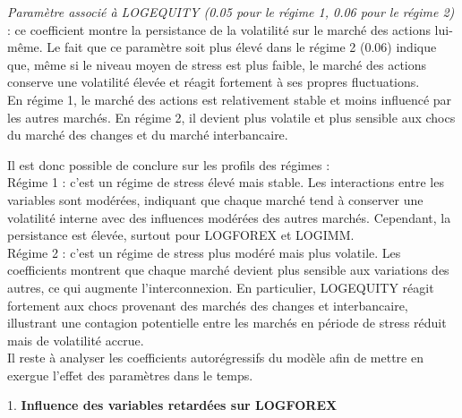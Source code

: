 \textit{Paramètre associé à LOGEQUITY (0.05 pour le régime 1, 0.06 pour le régime 2)} : ce coefficient montre la persistance de la volatilité sur le marché des actions lui-même. Le fait que ce paramètre soit plus élevé dans le régime 2 (0.06) indique que, même si le niveau moyen de stress est plus faible, le marché des actions conserve une volatilité élevée et réagit fortement à ses propres fluctuations.\\

En régime 1, le marché des actions est relativement stable et moins influencé par les autres marchés. En régime 2, il devient plus volatile et plus sensible aux chocs du marché des changes et du marché interbancaire.

\vspace{0.5cm}

Il est donc possible de conclure sur les profils des régimes :\\

Régime 1 : c’est un régime de stress élevé mais stable. Les interactions entre les variables sont modérées, indiquant que chaque marché tend à conserver une volatilité interne avec des influences modérées des autres marchés. Cependant, la persistance est élevée, surtout pour LOGFOREX et LOGIMM.\\

Régime 2 : c’est un régime de stress plus modéré mais plus volatile. Les coefficients montrent que chaque marché devient plus sensible aux variations des autres, ce qui augmente l’interconnexion. En particulier, LOGEQUITY réagit fortement aux chocs provenant des marchés des changes et interbancaire, illustrant une contagion potentielle entre les marchés en période de stress réduit mais de volatilité accrue.\\

Il reste à analyser les coefficients autorégressifs du modèle afin de mettre en exergue l'effet des paramètres dans le temps.

\vspace{0.5cm}

1. \textbf{Influence des variables retardées sur LOGFOREX}\\

